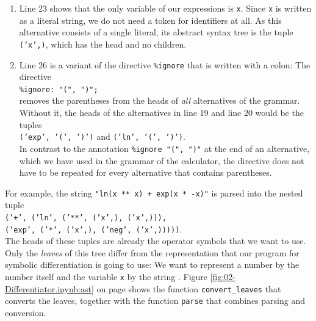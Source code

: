 \begin{enumerate}
      these alternatives are the strings  and .  Hence, the abstract syntax tree of
      the string \texttt{"exp(x)"} is the pair \texttt{('exp', $\textsl{ast}$)}.  For the same reason, the
      alternative \texttt{"(" expr ")"} in line 21 consists of a single symbol and returns the abstract syntax
      tree of \texttt{expr}.
\item Line 23 shows that the only variable of our expressions is \texttt{x}.  Since \texttt{x} is written
      as a literal string, we do not need a token for identifiers at all.  As this alternative consists of a
      single literal, its abstract syntax tree is the tuple \texttt{('x',)}, which has the head  and
      no children.
\item Line 26 is a variant of the directive \texttt{\%ignore} that is written with a colon:  The directive
      \\[0.2cm]
      \hspace*{1.3cm}
      \verb|%ignore: "(", ")";|
      \\[0.2cm]
      removes the parentheses from the heads of \emph{all} alternatives of the grammar.  Without it, the
      heads of the alternatives in line 19 and line 20 would be the tuples
      \\[0.2cm]
      \hspace*{1.3cm}
      \texttt{('exp', '(', ')')} \quad and \quad \texttt{('ln', '(', ')')}.
      \\[0.2cm]
      In contrast to the annotation \texttt{\%ignore "(", ")"} at the end of an alternative, which we have
      used in the grammar of the calculator, the directive does not have to be repeated for every alternative
      that contains parentheses.
\end{enumerate}
\FloatBarrier

\noindent
For example, the string \texttt{"ln(x ** x) + exp(x * -x)"} is parsed into the nested tuple
\\[0.2cm]
\hspace*{0.3cm}
\texttt{('+', ('ln', ('**', ('x',), ('x',))),}
\\
\hspace*{0.8cm}
\texttt{('exp', ('*', ('x',), ('neg', ('x',)))))}.
\\[0.2cm]
The heads of these tuples are already the operator symbols that we want to use.  Only the \emph{leaves} of this
tree differ from the representation that our program for symbolic differentiation is going to use:  We want to
represent a number by the number itself and the variable \texttt{x} by the string .
Figure \ref{fig:02-Differentiator.ipynb:ast} on page \pageref{fig:02-Differentiator.ipynb:ast} shows the
function \texttt{convert\_leaves} that converts the leaves, together with the function \texttt{parse} that
combines parsing and conversion.

